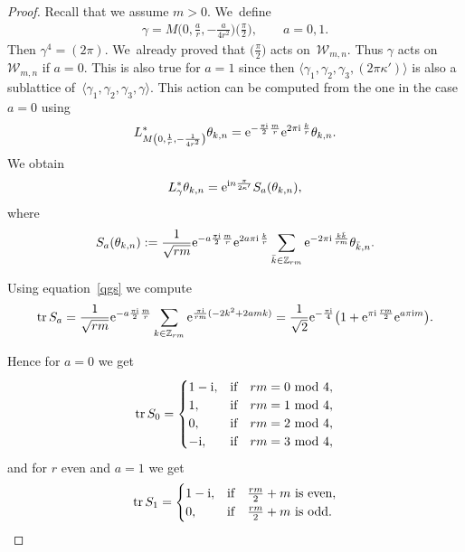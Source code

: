 \documentclass[pdftex]{sigma}
\newcommand\Z{{\mathbb Z}}
\newcommand\cW{{\mathcal W}}
\newcommand{\tr}{\mathop{{\rm tr}}}
\newcommand\la{\langle}
\newcommand\ra{\rangle}
\numberwithin{equation}{section}
\begin{document}
\begin{proof}
Recall that we assume $m>0$. We~define
\begin{gather*}
\gamma= M\bigg(0,\frac{a}{r},-\frac{a}{4r^2}\bigg)\bigg(\frac{\pi}{2}\bigg),\qquad a=0,1.
\end{gather*}
Then $\gamma^4=(2\pi)$. We~already proved that $\big(\frac \pi2\big)$ acts on~$\cW_{m,n}$. Thus $\gamma$ acts on~$\cW_{m,n}$ if $a=0$. This is also true for $a=1$ since then $\la \gamma_1,\gamma_2,\gamma_3,(2\pi \kappa')\ra$ is also a sublattice of~$\la \gamma_1,\gamma_2,\gamma_3,\gamma\ra$.
This action can be computed from the one in the case $a=0$ using
\begin{gather*}
L^*_{M\left(0,\frac1{r},-\frac1{4r^2}\right)}\theta_{k,n}={\rm e}^{-\frac{\pi {\rm i}}{2}\frac{m}{r}}{\rm e}^{2\pi {\rm i}\,\frac{k}{r}}\theta_{k,n}.
\end{gather*}
We obtain
\begin{gather*}
L^*_{\gamma}\theta_{k,n}={\rm e}^{{\rm i}n\frac{\pi}{2\kappa'}}S_a(\theta_{k,n}),
\end{gather*}
where
\begin{gather*}
S_a(\theta_{k,n}):=\frac{1}{\sqrt{rm}}{\rm e}^{-a\frac{\pi {\rm i}}{2}\frac{m}{r}}{\rm e}^{2a\pi {\rm i}\,\frac{k}{r}}\sum_{\bar k\in\Z_{rm}}{\rm e}^{-2\pi {\rm i}\,\frac{k\bar k}{rm}}\theta_{\bar k,n}.\end{gather*}

Using equation~\eqref{qgs} we compute
\begin{gather*}
\tr S_a=\frac{1}{\sqrt{rm}}{\rm e}^{-a\frac{\pi {\rm i}}{2}\frac{m}{r}}\sum_{k\in\Z_{rm}}{\rm e}^{\frac{\pi {\rm i}}{rm}(-2k^2+2amk)}
= \frac{1}{\sqrt{2}}{\rm e}^{-\frac{\pi {\rm i}}{4}}\big(1+{\rm e}^{\pi {\rm i}\,\frac{rm}{2}}{\rm e}^{a\pi {\rm i} m}\big).
\end{gather*}

Hence for $a=0$ we get
\begin{gather*}
\tr S_0=\begin{cases}
1-{\rm i},&\text{if}\quad rm=0\ {\rm mod}\ 4,
\\
1,&\text{if}\quad rm=1\ {\rm mod}\ 4,
\\
0,&\text{if}\quad rm=2\ {\rm mod}\ 4,
\\
-{\rm i},&\text{if}\quad rm=3\ {\rm mod}\ 4,
\end{cases}
\end{gather*}
and for $r$ even and $a=1$ we get
\begin{gather*}
\tr S_1=\begin{cases}
1-{\rm i},&\text{if\quad $\frac{rm}{2}+m$ is even},
\\[0ex]
0,&\text{if\quad $\frac{rm}{2}+m$ is odd}.
\end{cases}
\end{gather*}


\end{proof}
\end{document}
